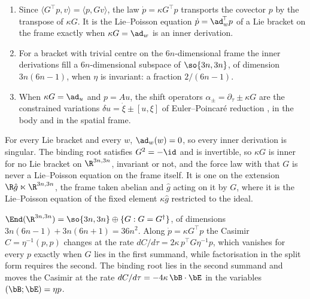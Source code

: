 \begin{proposition}
\label{prop:EAdict}
\begin{enumerate}[label=(\roman*),leftmargin=2.2em]
\item Since $\langle G^{\!\top}p,v\rangle=\langle p,Gv\rangle$, the law $\dot p=\kappa G^{\!\top}p$ transports the covector $p$ by the transpose of $\kappa G$.
It is the Lie--Poisson equation $\dot p=\ad_w^{\!\top}p$ of a Lie bracket on the frame exactly when $\kappa G=\ad_w$ is an inner derivation.
\item For a bracket with trivial centre on the $6n$-dimensional frame the inner derivations fill a $6n$-dimensional subspace of $\so{3n,3n}$, of
dimension $3n(6n-1)$, when $\eta$ is invariant: a fraction $2/(6n-1)$.
\item When $\kappa G=\ad_u$ and $p=Au$, the shift operators $\alpha_\pm=\partial_\tau\pm\kappa G$ are the constrained variations
$\delta u=\dot\xi\pm[u,\xi]$ of Euler--Poincar\'e reduction \cite{MarsdenRatiu99,HolmMarsdenRatiu98}, in the body and in the spatial frame.
\end{enumerate}
\end{proposition}

\begin{proposition}
\label{prop:EAnotinner}
For every Lie bracket and every $w$, $\ad_w(w)=0$, so every inner derivation is singular. The binding root satisfies $G^2=-\id$ and is
invertible, so $\kappa G$ is inner for no Lie bracket on $\R^{3n,3n}$, invariant or not, and the force law with that $G$ is never a
Lie--Poisson equation on the frame itself. It is one on the extension $\R\hat g\ltimes\R^{3n,3n}$, the frame taken abelian and $\hat g$ acting on
it by $G$, where it is the Lie--Poisson equation of the fixed element $\kappa\hat g$ restricted to the ideal.
\end{proposition}

\begin{theorem}
\label{thm:EAdichotomy}
$\End(\R^{3n,3n})=\so{3n,3n}\oplus\{G:G=G^\dagger\}$, of dimensions $3n(6n-1)+3n(6n+1)=36n^2$. Along $\dot p=\kappa G^{\!\top}p$ the Casimir
$C=\eta^{-1}(p,p)$ changes at the rate $dC/d\tau=2\kappa\,p^{\!\top}G\eta^{-1}p$, which vanishes for every $p$ exactly when $G$ lies in the first
summand, while factorisation in the split form requires the second. The binding root lies in the second summand and moves the Casimir at the rate
$dC/d\tau=-4\kappa\,\bB\cdot\bE$ in the variables $(\bB;\bE)=\eta p$.
\end{theorem}

